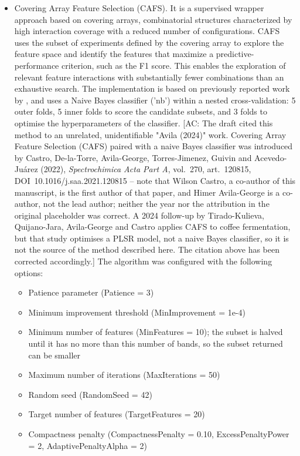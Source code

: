 \documentclass[final,5p,times,twocolumn]{elsarticle}
\newcommand{\added}[1]{{\color{blue}#1}}
\newcommand{\acnote}[1]{{\color{red}\small\textsf{[AC: #1]}}}
\begin{document}
\begin{itemize}
    \item [-] Covering Array Feature Selection (CAFS).
    It is a supervised wrapper approach based on covering arrays, combinatorial structures characterized by high interaction coverage with a reduced number of configurations. 
    CAFS uses the subset of experiments defined by the covering array to explore the feature space and identify the features that maximize a predictive-performance criterion, such as the F1 score.
    This enables the exploration of relevant feature interactions with substantially fewer combinations than an exhaustive search.
    The implementation is based on previously reported work by \citet{Castro2022cafs}, and uses a Naive Bayes classifier ('nb') \added{within a nested cross-validation: 5 outer folds, 5 inner folds to score the candidate subsets, and 3 folds to optimise the hyperparameters of the classifier}.
    \acnote{The draft cited this method to an unrelated, unidentifiable "Avila (2024)" work. Covering Array Feature Selection (CAFS) paired with a naive Bayes classifier was introduced by Castro, De-la-Torre, Avila-George, Torres-Jimenez, Guivin and Acevedo-Ju\'arez (2022), \emph{Spectrochimica Acta Part A}, vol.~270, art.~120815, DOI~10.1016/j.saa.2021.120815 -- note that Wilson Castro, a co-author of this manuscript, is the first author of that paper, and Himer Avila-George is a co-author, not the lead author; neither the year nor the attribution in the original placeholder was correct. A 2024 follow-up by Tirado-Kulieva, Quijano-Jara, Avila-George and Castro applies CAFS to coffee fermentation, but that study optimises a PLSR model, not a naive Bayes classifier, so it is not the source of the method described here. The citation above has been corrected accordingly.}
    The algorithm was configured with the following options: 
    \begin{itemize}
        \item Patience parameter (Patience = 3)
        \item Minimum improvement threshold (MinImprovement = 1e-4)
        \item Minimum number of features (MinFeatures = 10)\added{; the subset is halved until it has no more than this number of bands, so the subset returned can be smaller}
        \item Maximum number of iterations (MaxIterations = 50)
        \item Random seed (RandomSeed = 42)
        \item \added{Target number of features (TargetFeatures = 20)}
        \item \added{Compactness penalty (CompactnessPenalty = 0.10, ExcessPenaltyPower = 2, AdaptivePenaltyAlpha = 2)}
    \end{itemize}


\end{itemize}
\end{document}
